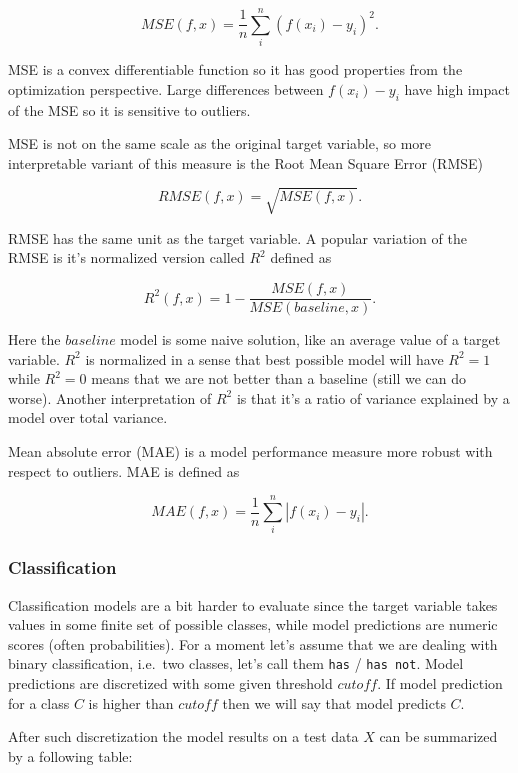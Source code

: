 \documentclass[12pt,]{krantz}
\begin{document}
\[
MSE(f, x) = \frac{1}{n} \sum_{i}^{n} (f(x_i) - y_i)^2.
\]

MSE is a convex differentiable function so it has good properties from the optimization perspective.
Large differences between \(f(x_i) - y_i\) have high impact of the MSE so it is sensitive to outliers.

MSE is not on the same scale as the original target variable, so more interpretable variant of this measure is the Root Mean Square Error (RMSE)

\[
RMSE(f, x) = \sqrt{MSE(f, x)}.
\]

RMSE has the same unit as the target variable. A popular variation of the RMSE is it's normalized version called \(R^2\) defined as

\[
R^2(f, x) = 1 - \frac{MSE(f, x)}{MSE(baseline, x)}.
\]

Here the \(baseline\) model is some naive solution, like an average value of a target variable. \(R^2\) is normalized in a sense that best possible model will have \(R^2 = 1\) while \(R^2 = 0\) means that we are not better than a baseline (still we can do worse). Another interpretation of \(R^2\) is that it's a ratio of variance explained by a model over total variance.

Mean absolute error (MAE) is a model performance measure more robust with respect to outliers. MAE is defined as

\[
MAE(f, x) = \frac{1}{n} \sum_{i}^{n} |f(x_i) - y_i|.
\]

\hypertarget{classification}{%
\subsubsection{Classification}\label{classification}}

Classification models are a bit harder to evaluate since the target variable takes values in some finite set of possible classes, while model predictions are numeric scores (often probabilities). For a moment let's assume that we are dealing with binary classification, i.e.~two classes, let's call them \texttt{has} / \texttt{has\ not}. Model predictions are discretized with some given threshold \(cutoff\). If model prediction for a class \(C\) is higher than \(cutoff\) then we will say that model predicts \(C\).

After such discretization the model results on a test data \(X\) can be summarized by a following table:
\end{document}
